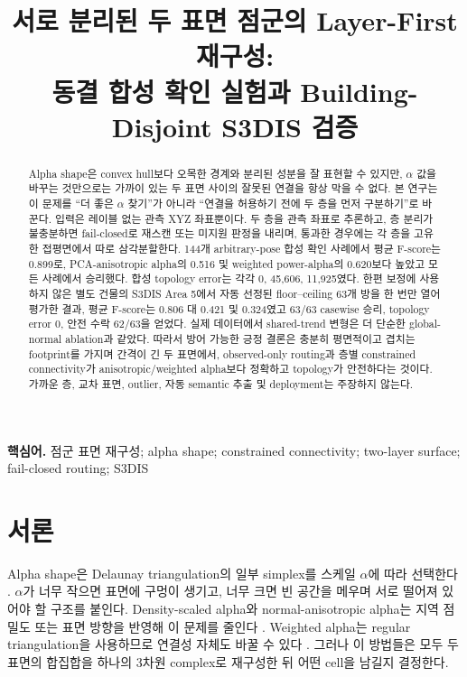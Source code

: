 \documentclass[12pt,a4paper]{article}
\title{서로 분리된 두 표면 점군의 Layer-First 재구성:\\
동결 합성 확인 실험과 Building-Disjoint S3DIS 검증}
\author{}
\date{}
\begin{document}
\maketitle
\thispagestyle{fancy}

\begin{abstract}
Alpha shape은 convex hull보다 오목한 경계와 분리된 성분을 잘 표현할 수
있지만, $\alpha$ 값을 바꾸는 것만으로는 가까이 있는 두 표면 사이의 잘못된
연결을 항상 막을 수 없다. 본 연구는 이 문제를 ``더 좋은 $\alpha$ 찾기''가
아니라 ``연결을 허용하기 전에 두 층을 먼저 구분하기''로 바꾼다. 입력은
레이블 없는 관측 XYZ 좌표뿐이다. 두 층을 관측 좌표로 추론하고, 층 분리가
불충분하면 fail-closed로 재스캔 또는 미지원 판정을 내리며, 통과한 경우에는
각 층을 고유한 접평면에서 따로 삼각분할한다. 144개 arbitrary-pose 합성
확인 사례에서 평균 F-score는 0.899로, PCA-anisotropic alpha의 0.516 및
weighted power-alpha의 0.620보다 높았고 모든 사례에서 승리했다. 합성
topology error는 각각 0, 45,606, 11,925였다. 한편 보정에 사용하지 않은
별도 건물의 S3DIS Area 5에서 자동 선정된 floor--ceiling 63개 방을 한 번만
열어 평가한 결과, 평균 F-score는 0.806 대 0.421 및 0.324였고 63/63
casewise 승리, topology error 0, 안전 수락 62/63을 얻었다. 실제 데이터에서
shared-trend 변형은 더 단순한 global-normal ablation과 같았다. 따라서
방어 가능한 긍정 결론은 충분히 평면적이고 겹치는 footprint를 가지며 간격이
긴 두 표면에서, observed-only routing과 층별 constrained connectivity가
anisotropic/weighted alpha보다 정확하고 topology가 안전하다는 것이다.
가까운 층, 교차 표면, outlier, 자동 semantic 추출 및 deployment는 주장하지
않는다.
\end{abstract}

\noindent\textbf{핵심어.} 점군 표면 재구성; alpha shape; constrained
connectivity; two-layer surface; fail-closed routing; S3DIS

\section{서론}

Alpha shape은 Delaunay triangulation의 일부 simplex를 스케일 $\alpha$에 따라
선택한다 \cite{edelsbrunner1994}. $\alpha$가 너무 작으면 표면에 구멍이
생기고, 너무 크면 빈 공간을 메우며 서로 떨어져 있어야 할 구조를 붙인다.
Density-scaled alpha와 normal-anisotropic alpha는 지역 점 밀도 또는 표면
방향을 반영해 이 문제를 줄인다 \cite{teichmann1998}. Weighted alpha는
regular triangulation을 사용하므로 연결성 자체도 바꿀 수 있다
\cite{edelsbrunner1992}. 그러나 이 방법들은 모두 두 표면의 합집합을 하나의
3차원 complex로 재구성한 뒤 어떤 cell을 남길지 결정한다.
\end{document}
